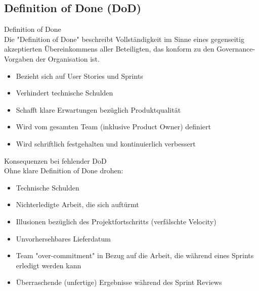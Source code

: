 \subsection{Definition of Done (DoD)}

\begin{definition}{Definition of Done}\\
    Die "Definition of Done" beschreibt Vollständigkeit im Sinne eines gegenseitig akzeptierten Übereinkommens aller Beteiligten, das konform zu den Governance-Vorgaben der Organisation ist.
    \begin{itemize}
        \item Bezieht sich auf User Stories und Sprints
        \item Verhindert technische Schulden
        \item Schafft klare Erwartungen bezüglich Produktqualität
        \item Wird vom gesamten Team (inklusive Product Owner) definiert
        \item Wird schriftlich festgehalten und kontinuierlich verbessert
    \end{itemize}
\end{definition}

\begin{concept}{Konsequenzen bei fehlender DoD}\\
    Ohne klare Definition of Done drohen:
    \begin{itemize}
        \item Technische Schulden
        \item Nichterledigte Arbeit, die sich auftürmt
        \item Illusionen bezüglich des Projektfortschritts (verfälschte Velocity)
        \item Unvorhersehbares Lieferdatum
        \item Team "over-commitment" in Bezug auf die Arbeit, die während eines Sprints erledigt werden kann
        \item Überraschende (unfertige) Ergebnisse während des Sprint Reviews
    \end{itemize}
\end{concept}

